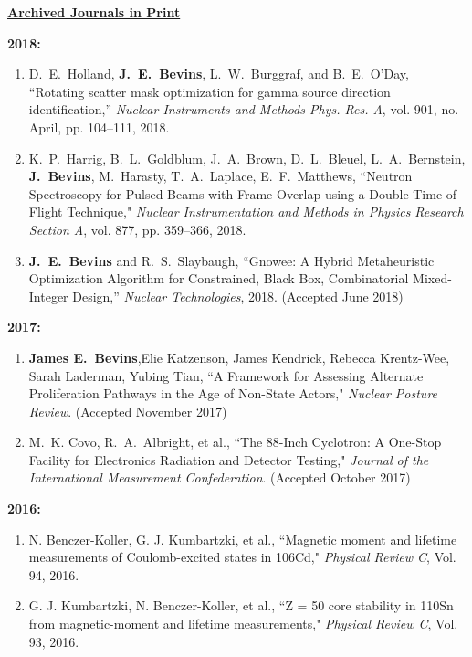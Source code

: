 \underline{\textbf{Archived Journals in Print}}

\textbf{2018:}
\begin{enumerate}
  \item D.\ E.\ Holland, \textbf{J.\ E.\ Bevins}, L.\ W.\ Burggraf, and B.\ E.\ O’Day, ``Rotating scatter mask optimization for gamma source direction identification,” \textit{Nuclear Instruments and Methods Phys. Res. A}, vol. 901, no. April, pp. 104–111, 2018.
  
  \item K.\ P.\ Harrig, B.\ L.\ Goldblum, J.\ A.\ Brown, D.\ L.\ Bleuel, L.\ A.\ Bernstein, \textbf{J.\ Bevins}, M.\ Harasty, T.\ A.\ Laplace, E.\ F.\ Matthews, ``Neutron Spectroscopy for Pulsed Beams with Frame Overlap using a Double Time-of-Flight Technique," \textit{Nuclear Instrumentation and Methods in Physics Research Section A}, vol. 877, pp. 359–366, 2018.

  \item \textbf{J.\ E.\ Bevins} and R.\ S.\ Slaybaugh, ``Gnowee: A Hybrid Metaheuristic Optimization Algorithm for Constrained, Black Box, Combinatorial Mixed-Integer Design,” \textit{Nuclear Technologies}, 2018. (Accepted June 2018)
\end{enumerate}

\textbf{2017:}
\begin{enumerate}
  \item \textbf{James E.\ Bevins},Elie Katzenson, James Kendrick, Rebecca Krentz-Wee, Sarah Laderman, Yubing Tian, ``A Framework for Assessing Alternate Proliferation Pathways in the Age of Non-State Actors," \textit{Nuclear Posture Review}. (Accepted November 2017)
  
\item M.\ K. Covo, R.\ A.\ Albright, et al., ``The 88-Inch Cyclotron: A One-Stop Facility for Electronics Radiation and Detector Testing," \textit{Journal of the International Measurement Confederation}. (Accepted October 2017)
\end{enumerate}

\textbf{2016:}
\begin{enumerate}
  \item N. Benczer-Koller, G. J. Kumbartzki, et al., ``Magnetic moment and lifetime measurements of Coulomb-excited states in 106Cd," \textit{Physical Review C}, Vol. 94, 2016.
  
  \item G. J. Kumbartzki, N. Benczer-Koller, et al., ``Z = 50 core stability in 110Sn from magnetic-moment and lifetime measurements," \textit{Physical Review C}, Vol. 93, 2016.
\end{enumerate}

